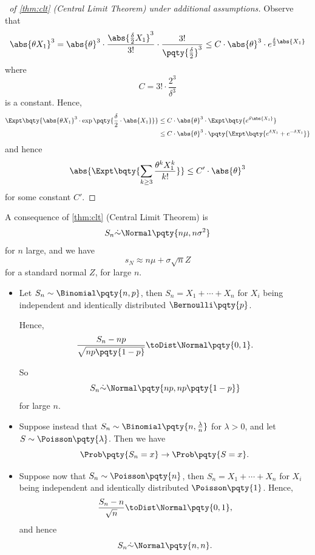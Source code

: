 \begin{proof}[\proofname\ of \autoref{thm:clt} (Central Limit Theorem) under additional assumptions]
    Observe that
    \[
        \abs{\theta X_1}^3 = \abs{\theta}^3 \cdot \frac{\abs{\frac{\delta}{2} X_1}^3}{3!} \cdot \frac{3!}{\pqty{\frac{\delta}{2}}^3} \leq C \cdot \abs{\theta}^3 \cdot e^{\frac{\delta}{2} \abs{X_1}}
    \]
    where
    \[
        C = 3! \cdot \frac{2^3}{\delta^3}
    \]
    is a constant. Hence,
    \begin{align*}
        \Expt\bqty{\abs{\theta X_1}^3 \cdot \exp \pqty{\frac{\delta}{2} \cdot \abs{X_1}}} &\leq C \cdot \abs{\theta}^3 \cdot \Expt\bqty{e^{\delta \abs{X_1}}} \\
        &\leq C \cdot \abs{\theta}^3 \cdot \pqty{\Expt\bqty{e^{\delta X_1} + e^{- \delta X_1}}}
    \end{align*}
    and hence
    \[
        \abs{\Expt\bqty{\sum_{k \geq 3} \frac{\theta^k X_1^k}{k!}}} \leq C' \cdot \abs{\theta}^3
    \]
    for some constant \(C'\).
\end{proof}

A consequence of \autoref{thm:clt} (Central Limit Theorem) is
\[
    S_n \dot{\sim} \Normal\pqty{n \mu, n \sigma^2}
\]
for \(n\) large, and we have
\[
    s_N \approx n \mu + \sigma \sqrt{n} Z
\]
for a standard normal \(Z\), for large \(n\).

\begin{example}
    \label{ex:clt}%
    \begin{itemize}
        \item Let \(S_n \sim \Binomial\pqty{n, p}\), then \(S_n = X_1 + \cdots + X_n\) for \(X_i\) being independent and identically distributed \(\Bernoulli \pqty{p}\).

        Hence,
        \[
            \frac{S_n - np}{\sqrt{n p \pqty{1 - p}}} \toDist \Normal\pqty{0, 1}.
        \]

        So
        \[
            S_n \dot{\sim} \Normal\pqty{np, np\pqty{1 - p}}
        \]
        for large \(n\).

        \item Suppose instead that \(S_n \sim \Binomial\pqty{n, \frac{\lambda}{n}}\) for \(\lambda > 0\), and let \(S \sim \Poisson\pqty{\lambda}\). Then we have
        \[
            \Prob\pqty{S_n = x} \to \Prob\pqty{S = x}.
        \]

        \item Suppose now that \(S_n \sim \Poisson\pqty{n}\), then \(S_n = X_1 + \cdots + X_n\) for \(X_i\) being independent and identically distributed \(\Poisson \pqty{1}\). Hence,
        \[
            \frac{S_n - n}{\sqrt{n}} \toDist \Normal\pqty{0, 1},
        \]
        and hence
        \[
            S_n \dot{\sim} \Normal\pqty{n, n}.
        \]
    \end{itemize}
\end{example}

